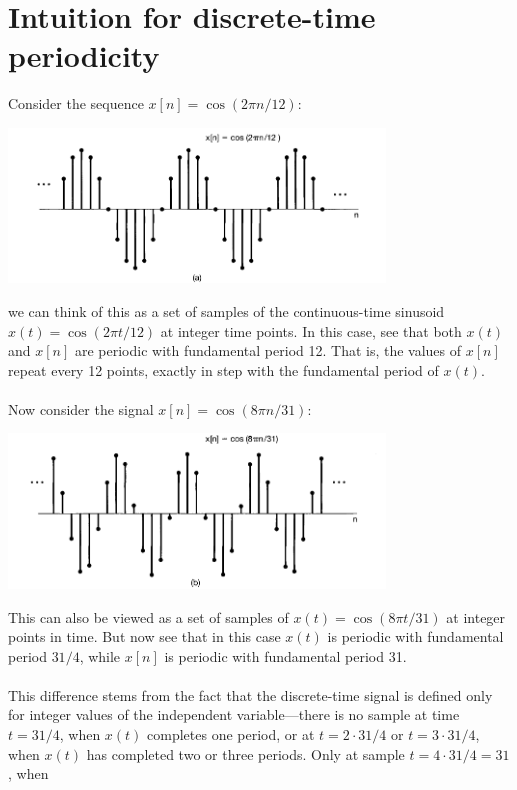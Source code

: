 \documentclass{report}
\begin{document}
\section{Intuition for discrete-time periodicity}
Consider the sequence $x[n]=\cos(2\pi n/12)$:
\begin{center}
\includegraphics[width=10cm]{a3}
\end{center}
we can think of this as a set of samples of the continuous-time sinusoid $x(t)=\cos(2\pi t/12)$ at integer time
points. In this case, see that both $x(t)$ and $x[n]$ are periodic with fundamental period 12.
That is, the values of $x[n]$ repeat every 12 points, exactly in step with the fundamental period of $x(t)$.\\
\vspace{1mm}\\
Now consider the signal $x[n]=\cos(8\pi n/31)$:
\begin{center}
\includegraphics[width=10cm]{a4}
\end{center}
This can also be viewed as a set of samples of $x(t)=\cos(8\pi t/31)$ at integer points in time. 
But now see that in this case $x(t)$ is periodic with fundamental period $31/4$, while $x[n]$ is periodic with 
fundamental period 31.\\
\vspace{1mm}\\
This difference stems from the fact that the discrete-time signal is defined only for integer values of the 
independent variable---there is no sample at time
$t=31/4$, when $x(t)$ completes one period, or at $t=2\cdot31/4$ or $t=3\cdot31/4$, when $x(t)$ has completed two
or three periods. Only at sample $t=4\cdot31/4=31$, when
\end{document}
